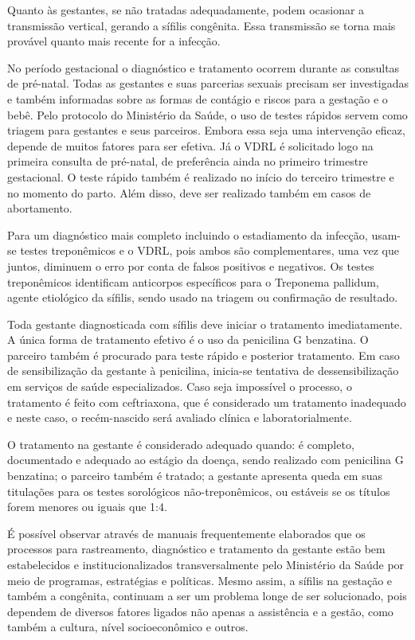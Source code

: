 Quanto às gestantes, se não tratadas adequadamente, podem ocasionar a transmissão vertical, gerando a sífilis congênita. Essa transmissão se torna mais provável quanto mais recente for a infecção. 

No período gestacional o diagnóstico e tratamento ocorrem durante as consultas de  pré-natal. Todas as gestantes e suas parcerias sexuais precisam ser investigadas  e também informadas sobre as formas de contágio e riscos para a gestação e o bebê. Pelo protocolo do Ministério da Saúde, o uso de testes rápidos servem como triagem para gestantes e seus parceiros. Embora essa seja uma intervenção eficaz,  depende de muitos fatores para ser efetiva. Já o VDRL é solicitado logo na primeira consulta de pré-natal, de preferência ainda no primeiro trimestre gestacional. O teste rápido também é realizado no início do terceiro trimestre e no momento do parto. Além disso, deve ser realizado também em casos de abortamento. \cite{brasil2015protocolo}

Para um diagnóstico mais completo incluindo o estadiamento da infecção, usam-se testes treponêmicos e o VDRL, pois ambos são complementares, uma vez que juntos, diminuem o erro por conta de falsos positivos e negativos. Os testes treponêmicos identificam anticorpos específicos para o Treponema pallidum, agente etiológico da sífilis, sendo usado na triagem ou confirmação de resultado. \cite{sao2016guia}

Toda gestante diagnosticada com sífilis deve iniciar o tratamento imediatamente. A única forma de tratamento efetivo é o uso da penicilina G benzatina. O parceiro também é procurado para teste rápido e posterior tratamento. Em caso de sensibilização da gestante à penicilina, inicia-se tentativa de dessensibilização em serviços de saúde especializados. Caso seja impossível o processo, o tratamento é feito com ceftriaxona, que é considerado um tratamento inadequado e neste caso, o recém-nascido será avaliado clínica e laboratorialmente. \cite{sao2016guia}

O tratamento na gestante é considerado adequado quando: é completo, documentado e adequado ao estágio da doença, sendo realizado com penicilina G benzatina; o parceiro também é tratado; a gestante apresenta queda em suas titulações para os testes sorológicos não-treponêmicos, ou estáveis se os títulos forem menores ou iguais que 1:4. \cite{sao2016guia}

É possível observar através de manuais frequentemente elaborados que os processos para rastreamento, diagnóstico e tratamento da gestante estão bem estabelecidos e institucionalizados transversalmente pelo Ministério da Saúde por meio de programas, estratégias e políticas. Mesmo assim, a sífilis na gestação e também a congênita, continuam a ser um problema longe de ser solucionado, pois dependem de diversos fatores ligados não apenas a assistência e a gestão, como também a cultura, nível socioeconômico e outros. 

